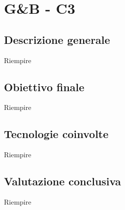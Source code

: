 \section{G\&B - C3} \label{c3}
    \subsection{Descrizione generale}
    Riempire

    \subsection{Obiettivo finale}
    Riempire

    \subsection{Tecnologie coinvolte}
    Riempire

    \subsection{Valutazione conclusiva}
    Riempire
